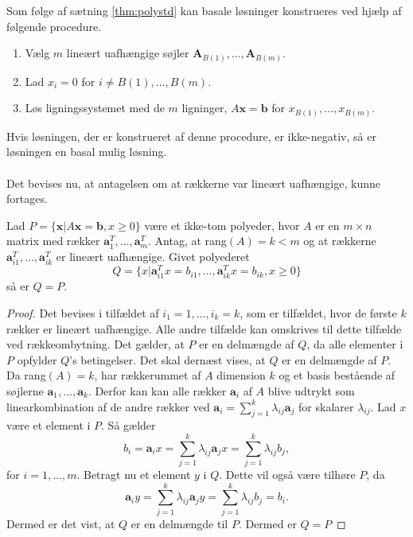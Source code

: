 \noindent
Som følge af sætning \ref{thm:polystd} kan basale løsninger konstrueres ved hjælp af følgende procedure.
\begin{enumerate}
\item Vælg $m$ lineært uafhængige søjler $\textbf{A}_{B(1)},\ldots,\textbf{A}_{B(m)}.$
\item Lad $x_i=0$ for $i \neq B(1),\ldots,B(m).$
\item Løs ligningssystemet med de $m$ ligninger, $A\textbf{x}=\textbf{b}$ for $x_{B(1)}, \ldots , x_{B(m)}.$
\end{enumerate}
Hvis løsningen, der er konstrueret af denne procedure, er ikke-negativ, så er løsningen en basal mulig løsning.
\\\\
\noindent
Det bevises nu, at antagelsen om at rækkerne var lineært uafhængige, kunne fortages.
\begin{thm}{}{}
Lad $P=\{\textbf{x}|A\textbf{x}=\textbf{b},x\geq 0\}$ være et ikke-tom polyeder, hvor $A$ er en $m \times n$ matrix med rækker $\textbf{a}^{T}_{1},\ldots,\textbf{a}^{T}_{m}$.
Antag, at rang$(A)=k<m$ og at rækkerne $\textbf{a}^T_{i1},\ldots,\textbf{a}^T_{ik}$ er lineært uafhængige. Givet polyederet 
$$Q=\{x|\textbf{a}^T_{i1}x=b_{i1},\ldots,\textbf{a}^T_{ik}x=b_{ik}, x \geq 0  \}$$ 
så er $Q=P$.
\end{thm}
\begin{proof}
Det bevises i tilfældet af $i_1=1,\ldots,i_k=k$, som er tilfældet, hvor de første $k$ rækker er lineært uafhængige. 
Alle andre tilfælde kan omskrives til dette tilfælde ved rækkeombytning. 
Det gælder, at $P$ er en delmængde af $Q$, da alle elementer i $P$ opfylder $Q$'s betingelser. 
Det skal dernæst vises, at $Q$ er en delmængde af $P$.
Da rang$(A)=k$, har rækkerummet af $A$ dimension $k$ og et basis bestående af søjlerne $\textbf{a}_1,\ldots,\textbf{a}_k$. 
Derfor kan kan alle rækker $\textbf{a}_i$ af $A$ blive udtrykt som linearkombination af de andre rækker ved $\textbf{a}_i=\sum^{k}_{j=1}\lambda_{ij}\textbf{a}_j$ for skalarer $\lambda_{ij}$. 
Lad $x$ være et element i $P$. 
Så gælder
$$b_i=\textbf{a}_ix=\sum^{k}_{j=1}\lambda_{ij}\textbf{a}_jx=\sum^{k}_{j=1}\lambda_{ij}b_j,$$
for $i=1,\ldots,m.$
Betragt nu et element $y$ i $Q$. 
Dette vil også være tilhøre $P$, da
$$ \textbf{a}_iy=\sum^{k}_{j=1}\lambda_{ij}\textbf{a}_jy=\sum^{k}_{j=1}\lambda_{ij}b_j=b_i.$$
Dermed er det vist, at $Q$ er en delmængde til $P$. 
Dermed er $Q=P$
\end{proof} \\

